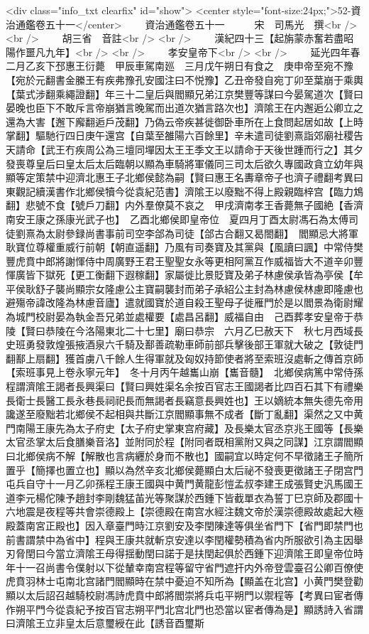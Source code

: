 <div class="info_txt clearfix" id="show">
<center style="font-size:24px;">52-資治通鑑卷五十一</center>
  　　資治通鑑卷五十一　　　宋　司馬光　撰<br />
<br />
　　胡三省　音註<br />
<br />
　　漢紀四十三【起旃蒙赤奮若盡昭陽作噩凡九年】<br />
<br />
　　孝安皇帝下<br />
<br />
　　延光四年春二月乙亥下邳惠王衍薨　甲辰車駕南廵　三月戊午朔日有食之　庚申帝至宛不豫【宛於元翻書金縢王有疾弗豫孔安國注曰不悦豫】乙丑帝發自宛丁卯至葉崩于乘輿【葉式涉翻乘繩證翻】年三十二皇后與閻顯兄弟江京樊豐等謀曰今晏駕道次【賢曰晏晚也臣下不敢斥言帝崩猶言晚駕而出道次猶言路次也】濟隂王在内邂逅公卿立之還為大害【邂下廨翻逅戶茂翻】乃偽云帝疾甚徙御卧車所在上食問起居如故【上時掌翻】驅馳行四日庚午還宫【自葉至雒陽六百餘里】辛未遣司徒劉熹詣郊廟社稷告天請命【武王冇疾周公為三壇同墠因太王王季文王以請命于天後世踵而行之】其夕發喪尊皇后曰皇太后太后臨朝以顯為車騎將軍儀同三司太后欲久專國政貪立幼年與顯等定策禁中迎濟北惠王子北鄉侯懿為嗣【賢曰惠王名夀章帝子也濟子禮翻考異曰東觀記續漢書作北鄉侯犢今從袁紀范書】濟隂王以廢黜不得上殿親臨梓宫【臨力鴆翻】悲號不食【號戶刀翻】内外羣僚莫不哀之　甲戌濟南孝王香薨無子國絶【香濟南安王康之孫康光武子也】　乙酉北鄉侯即皇帝位　夏四月丁酉太尉馮石為太傅司徒劉熹為太尉參録尚書事前司空李郃為司徒【郃古合翻又曷閤翻】　閻顯忌大將軍耿寶位尊權重威行前朝【朝直遥翻】乃風有司奏寶及其黨與【風讀曰諷】中常侍樊豐虎賁中郎將謝惲侍中周廣野王君王聖聖女永等更相阿黨互作威福皆大不道辛卯豐惲廣皆下獄死【更工衡翻下遐稼翻】家屬徙比景貶寶及弟子林慮侯承皆為亭侯【牟平侯耿舒子襲尚顯宗女隆慮公主寶嗣襲封而弟子承紹公主封為林慮侯林慮即隆慮也避殤帝諱改隆為林慮音廬】遣就國寶於道自殺王聖母子徙雁門於是以閻景為衛尉耀為城門校尉晏為執金吾兄弟並處權要【處昌呂翻】威福自由　己酉葬孝安皇帝于恭陵【賢曰恭陵在今洛陽東北二十七里】廟曰恭宗　六月乙巳赦天下　秋七月西域長史班勇發敦煌張掖酒泉六千騎及鄯善疏勒車師前部兵擊後部王軍就大破之【敦徒門翻鄯上扇翻】獲首虜八千餘人生得軍就及匈奴持節使者將至索班沒處斬之傳首京師【索班事見上卷永寧元年】　冬十月丙午越巂山崩【巂音髓】　北鄉侯病篤中常侍孫程謂濟隂王謁者長興渠曰【賢曰興姓渠名余按百官志王國謁者比四百石其下有禮樂長衛士長醫工長永巷長祠祀長而無謁者長竊意長興姓也】王以嫡統本無失德先帝用讒遂至廢黜若北鄉侯不起相與共斷江京閻顯事無不成者【斷丁亂翻】渠然之又中黄門南陽王康先為太子府史【太子府史掌東宫府藏】及長樂太官丞京兆王國等【長樂太官丞掌太后食膳樂音洛】並附同於程【附同者既相黨附又與之同謀】江京謂閻顯曰北鄉侯病不解【解散也言病纒於身而不散也】國嗣宜以時定何不早徵諸王子簡所置乎【簡擇也置立也】顯以為然辛亥北鄉侯薨顯白太后祕不發喪更徵諸王子閉宫門屯兵自守十一月乙卯孫程王康王國與中黄門黄龍彭愷孟叔李建王成張賢史汎馬國王道李元楊佗陳予趙封李剛魏猛苖光等聚謀於西鍾下皆截單衣為誓丁巳京師及郡國十六地震是夜程等共會崇德殿上【崇德殿在南宫水經注魏文帝於漢崇德殿故處起大極殿蓋南宮正殿也】因入章臺門時江京劉安及李閏陳達等俱坐省門下【省門即禁門也前書謂禁中為省中】程與王康共就斬京安達以李閏權勢積為省内所服欲引為主因舉刃脅閏曰今當立濟隂王母得揺動閏曰諾于是扶閏起俱於西鍾下迎濟隂王即皇帝位時年十一召尚書令僕射以下從輦幸南宫程等留守省門遮扞内外帝登雲臺召公卿百僚使虎賁羽林士屯南北宫諸門閻顯時在禁中憂迫不知所為【顯盖在北宫】小黄門樊登勸顯以太后詔召越騎校尉馮詩虎賁中郎將閻崇將兵屯平朔門以禦程等【考異曰宦者傳作朔平門今從袁紀予按百官志朔平門北宫北門也恐當以宦者傳為是】顯誘詩入省謂曰濟隂王立非皇太后意璽綬在此【誘音酉璽斯